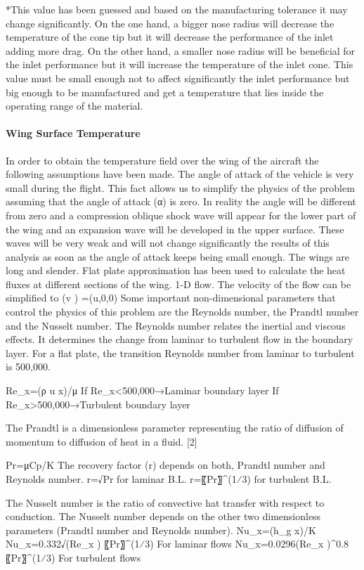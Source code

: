 *This value has been guessed and based on the manufacturing tolerance it may change significantly. On the one hand, a bigger nose radius will decrease the temperature of the cone tip but it will decrease the performance of the inlet adding more drag. On the other hand, a smaller nose radius will be beneficial for the inlet performance but it will increase the temperature of the inlet cone. This value must be small enough not to affect significantly the inlet performance but big enough to be manufactured and get a temperature that lies inside the operating range of the material.

\paragraph{Wing Surface Temperature}
In order to obtain the temperature field over the wing of the aircraft the following assumptions have been made.
	The angle of attack of the vehicle is very small during the flight. This fact allows us to simplify the physics of the problem assuming that the angle of attack (α) is zero. In reality the angle will be different from zero and a compression oblique shock wave will appear for the lower part of the wing and an expansion wave will be developed in the upper surface. These waves will be very weak and will not change significantly the results of this analysis as soon as the angle of attack keeps being small enough.
	The wings are long and slender. Flat plate approximation has been used to calculate the heat fluxes at different sections of the wing.
	1-D flow. The velocity of the flow can be simplified to (v ) ⃗=(u,0,0)
Some important non-dimensional parameters that control the physics of this problem are the Reynolds number, the Prandtl number and the Nusselt number.
The Reynolds number relates the inertial and viscous effects. It determines the change from laminar to turbulent flow in the boundary layer. For a flat plate, the transition Reynolds number from laminar to turbulent is 500,000.

Re_x=(ρ u x)/μ	If   Re_x<500,000→Laminar boundary layer
	If   Re_x>500,000→Turbulent boundary layer

The Prandtl is a dimensionless parameter representing the ratio of diffusion of momentum to diffusion of heat in a fluid. [2]

Pr=μCp/K
The recovery factor (r) depends on both, Prandtl number and Reynolds number.
r=√Pr      for laminar B.L.	r=〖Pr〗^(1⁄3)      for turbulent B.L.


The Nusselt number is the ratio of convective hat transfer with respect to conduction. The Nusselt number depends on the other two dimensionless parameters (Prandtl number and Reynolds number).
Nu_x=(h_g x)/K
Nu_x=0.332√(Re_x ) 〖Pr〗^(1⁄3)	For laminar flows
Nu_x=0.0296(Re_x )^0.8 〖Pr〗^(1⁄3)	For turbulent flows

